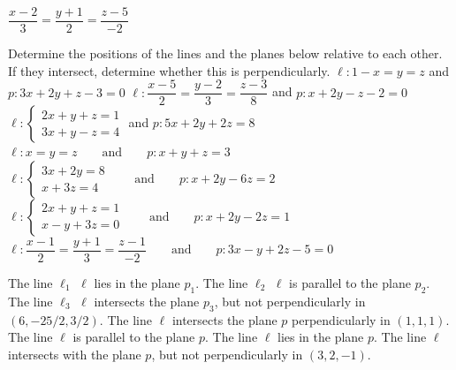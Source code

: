 \begin{Answer}\phantom{}
   $ \dfrac{x-2}{3}=\dfrac{y+1}{2}=\dfrac{z-5}{-2}$
\end{Answer}


\ifanalysis
	\begin{Exercise} Determine the positions of the lines and the planes below relative to each other. If they intersect, determine whether this is perpendicularly. 
	\Question[difficulty = 1] $\ell: 1-x=y=z$ \qquad and \qquad  $p: 3x+2y+z-3=0$  
	\Question[difficulty = 1] $\ell: \dfrac{x-5}{2}=\dfrac{y-2}{3}=\dfrac{z-3}{8}$ \qquad and \qquad $p: x+2y-z-2=0$
	\Question[difficulty = 2] $\ell: \left\{\begin{array}{l}
	2x+y+z=1 \\
	3x+y-z=4 \end{array}\right.$ \qquad and \qquad  $p:  5x+2y+2z=8$ 
    \Question[difficulty = 1]$\ell: x=y=z\qquad\mbox{and}\qquad p:  x+y+z=3$
    \Question[difficulty = 2]$\ell: \left\{\begin{array}{l}
     3x+2y=8 \\x+3z=4
     \end{array}\right.\qquad\mbox{and}\qquad p:   x+2y-6z=2$
    \Question[difficulty = 2] $\ell: \left\{\begin{array}{l}
     2x+y+z=1\\x-y+3z=0
     \end{array}\right.\qquad\mbox{and}\qquad p:  x+2y-2z=1$
    \Question[difficulty = 2] $\ell: \dfrac{x-1}{2}=\dfrac{y+1}{3}=\dfrac{z-1}{-2}\qquad\mbox{and}\qquad p:   3x-y+2z-5=0$

\end{Exercise}

\begin{Answer}\phantom{}
   
	\Question The line \ifcalculus $\ell_1$ \fi \ifanalysis $\ell$ \fi lies in the plane $p_1$.
	\Question The line \ifcalculus  $\ell_2$ \fi \ifanalysis $\ell$ \fi is parallel to the plane $p_2$.
	\Question The line \ifcalculus $\ell_3$ \fi \ifanalysis $\ell$ \fi intersects the plane $p_3$, but not perpendicularly in $(6, -25/2, 3/2)$.
    \Question The line $\ell$ intersects the plane $p$ perpendicularly in $(1,1,1)$.
    \Question The line $\ell$ is parallel to the plane $p$.
    \Question The line $\ell$ lies in the plane $p$.
    \Question The line $\ell$ intersects with the plane $p$, but not perpendicularly in $(3,2,-1)$.
\end{Answer}

\fi

\ifanalysis\pagebreak\fi
\ifcalculus
\newpage\phantom{}
\fi


